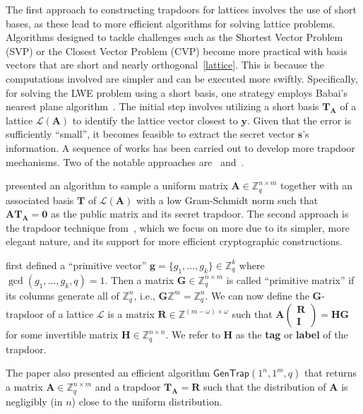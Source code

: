 \documentclass[cryptography,review,submit,pdftex,moreauthors,amsmath,amssymb,aps,strict]{Definitions/mdpi}
\begin{document}
The first approach to constructing trapdoors for lattices involves the use of short bases, as these lead to more efficient algorithms for solving lattice problems. Algorithms designed to tackle challenges such as the Shortest Vector Problem (SVP) or the Closest Vector Problem (CVP) become more practical with basis vectors that are short and nearly orthogonal~\ref{lattice}. This is because the computations involved are simpler and can be executed more swiftly. Specifically, for solving the LWE problem using a short basis, one strategy employs Babai's nearest plane algorithm~\cite{Babai}. The initial step involves utilizing a short basis $\mathbf{T}_{\mathbf{A}}$ of a lattice $\mathcal{L}(\mathbf{A})$ to identify the lattice vector closest to $\mathbf{y}$. Given that the error is sufficiently ``small'', it becomes feasible to extract the secret vector $\mathbf{s}$'s information. A sequence of works has been carried out to develop more trapdoor mechanisms. Two of the notable approaches are~\cite{AP09} and~\cite{MP12}.

\cite{AP09} presented an algorithm to sample a uniform matrix $\mathbf{A}\in\mathbb{Z}_q^{n\times m}$ together with an associated basis $\mathbf{T}$ of $\mathcal{L}({\mathbf{A}})$ with a low Gram-Schmidt norm such that $\mathbf{A}\mathbf{T}_{\mathbf{A}} = \mathbf{0}$ as the public matrix and its secret trapdoor. The second approach is the trapdoor technique from~\cite{MP12}, which we focus on more due to its simpler, more elegant nature, and its support for more efficient cryptographic constructions.

\cite{MP12} first defined a ``primitive vector'' $\mathbf{g}=\{g_1,\dots,g_k\}\in\mathbb{Z}^k_q$ where $\gcd(g_1,\dots,g_k,q)=1$. Then
a matrix $\mathbf{G}\in\mathbb{Z}^{n\times m}_q$ is called ``primitive matrix'' if its columns generate all of $\mathbb{Z}^n_q$, i.e., $\mathbf{G}\mathbb{Z}^m=\mathbb{Z}^n_q$. We can now define the $\mathbf{G}$-trapdoor of a lattice $\mathcal{L}$ is a matrix $\mathbf{R}\in\mathbb{Z}^{(m-\omega)\times \omega}$ such that $\mathbf{A}\begin{pmatrix}
    \mathbf{R}\\ 
    \mathbf{I}
  \end{pmatrix} = \mathbf{H}\mathbf{G}$ for some invertible matrix $\mathbf{H}\in\mathbb{Z}^{n\times n}_q$. We refer to $\mathbf{H}$ as the \textbf{tag} or \textbf{label} of the trapdoor. 

The paper also presented an efficient algorithm $\mathsf{GenTrap}(1^n,1^m,q)$ that returns a matrix $\mathbf{A}\in\mathbb{Z}^{n\times m}_q$ and a trapdoor $\mathbf{T}_{\mathbf{A}}=\mathbf{R}$ such that the distribution of $\mathbf{A}$ is negligibly (in $n$) close to the uniform distribution. 
\end{document}
